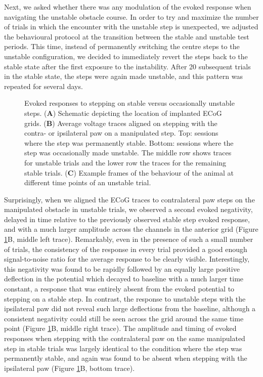 Next, we asked whether there was any modulation of the evoked response when navigating the unstable obstacle course. In order to try and maximize the number of trials in which the encounter with the unstable step is unexpected, we adjusted the behavioural protocol at the transition between the stable and unstable test periods. This time, instead of permanently switching the centre steps to the unstable configuration, we decided to immediately revert the steps back to the stable state after the first exposure to the instability. After 20 subsequent trials in the stable state, the steps were again made unstable, and this pattern was repeated for several days.

\begin{figure}
\centering

\caption{Evoked responses to stepping on stable versus occasionally unstable steps. (\textbf{A}) Schematic depicting the location of implanted ECoG grids. (\textbf{B}) Average voltage traces aligned on stepping with the contra- or ipsilateral paw on a manipulated step. Top: sessions where the step was permanently stable. Bottom: sessions where the step was occasionally made unstable. The middle row shows traces for unstable trials and the lower row the traces for the remaining stable trials. (\textbf{C}) Example frames of the behaviour of the animal at different time points of an unstable trial.}
\label{fig:ecog}
\end{figure}

Surprisingly, when we aligned the ECoG traces to contralateral paw steps on the manipulated obstacle in unstable trials, we observed a second evoked negativity, delayed in time relative to the previously observed stable step evoked response, and with a much larger amplitude across the channels in the anterior grid (Figure \ref{fig:ecog}B, middle left trace). Remarkably, even in the presence of such a small number of trials, the consistency of the response in every trial provided a good enough signal-to-noise ratio for the average response to be clearly visible. Interestingly, this negativity was found to be rapidly followed by an equally large positive deflection in the potential which decayed to baseline with a much larger time constant, a response that was entirely absent from the evoked potential to stepping on a stable step. In contrast, the response to unstable steps with the ipsilateral paw did not reveal such large deflections from the baseline, although a consistent negativity could still be seen across the grid around the same time point (Figure \ref{fig:ecog}B, middle right trace). The amplitude and timing of evoked responses when stepping with the contralateral paw on the same manipulated step in stable trials was largely identical to the condition where the step was permanently stable, and again was found to be absent when stepping with the ipsilateral paw (Figure \ref{fig:ecog}B, bottom trace).

